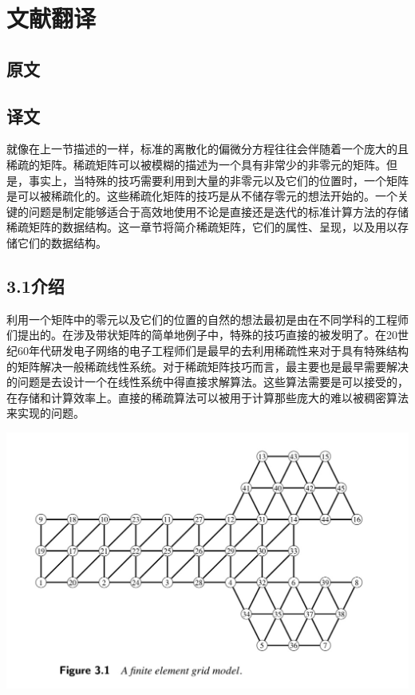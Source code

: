 \documentclass{article}
\begin{document}
 \newpage
\section{文献翻译}
\subsection{原文}
\qquad
\newline



\subsection{译文}
\qquad
\newline


就像在上一节描述的一样，标准的离散化的偏微分方程往往会伴随着一个庞大的且稀疏的矩阵。稀疏矩阵可以被模糊的描述为一个具有非常少的非零元的矩阵。但是，事实上，当特殊的技巧需要利用到大量的非零元以及它们的位置时，一个矩阵是可以被稀疏化的。这些稀疏化矩阵的技巧是从不储存零元的想法开始的。一个关键的问题是制定能够适合于高效地使用不论是直接还是迭代的标准计算方法的存储稀疏矩阵的数据结构。这一章节将简介稀疏矩阵，它们的属性、呈现，以及用以存储它们的数据结构。
\newline\newline

\subsection*{3.1介绍}

利用一个矩阵中的零元以及它们的位置的自然的想法最初是由在不同学科的工程师们提出的。在涉及带状矩阵的简单地例子中，特殊的技巧直接的被发明了。在20世纪60年代研发电子网络的电子工程师们是最早的去利用稀疏性来对于具有特殊结构的矩阵解决一般稀疏线性系统。对于稀疏矩阵技巧而言，最主要也是最早需要解决的问题是去设计一个在线性系统中得直接求解算法。这些算法需要是可以接受的，在存储和计算效率上。直接的稀疏算法可以被用于计算那些庞大的难以被稠密算法来实现的问题。
\newline\newline\newline\newline\newline\newline\newline\newline

\includegraphics[scale=0.25]{3_1.png}
\end{document}
